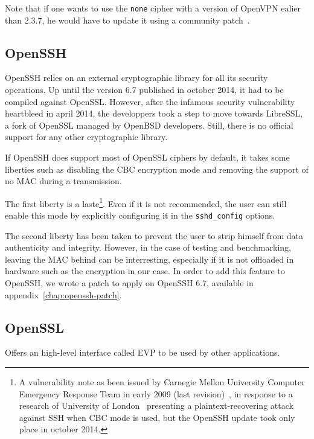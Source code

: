 \noindent Note that if one wants to use the \texttt{none} cipher with a version of OpenVPN ealier than 2.3.7, he would have to update it using a community patch~\cite{openvpn-patch-none}.

\subsection{OpenSSH}
OpenSSH relies on an external cryptographic library for all its security operations.
Up until the version 6.7 published in october 2014, it had to be compiled against OpenSSL.
However, after the infamous security vulnerability heartbleed in april 2014, the developpers took a step to move towards LibreSSL, a fork of OpenSSL managed by OpenBSD  developers.
Still, there is no official support for any other cryptographic library.

If OpenSSH does support most of OpenSSL ciphers by default, it takes some liberties such as disabling the CBC encryption mode and removing the support of no MAC during a transmission.

\noindent The first liberty is a laste\footnote{A vulnerability note as been issued by Carnegie Mellon University Computer Emergency Response Team in early 2009 (last revision)~\cite{CERT2009}, in response to a research of University of London~\cite{Albrecht:2009} presenting a plaintext-recovering attack against SSH when CBC mode is used, but the OpenSSH update took only place in october 2014.}.
Even if it is not recommended, the user can still enable this mode by explicitly configuring it in the \texttt{sshd\_config} options.

\noindent The second liberty has been taken to prevent the user to strip himself from data authenticity and integrity.
However, in the case of testing and benchmarking, leaving the MAC behind can be interresting, especially if it is not offloaded in hardware such as the encryption in our case.
In order to add this feature to OpenSSH, we wrote a patch to apply on OpenSSH 6.7, available in appendix~\ref{chap:openssh-patch}.




\subsection{OpenSSL}

Offers an high-level interface called EVP to be used by other applications.


